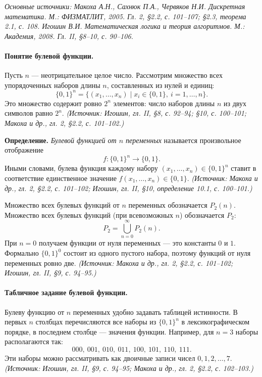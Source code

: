 \documentclass[a4paper,12pt]{article}
\begin{document}
\noindent\textit{Основные источники: Макоха А.Н., Сахнюк П.А., Червяков Н.И. Дискретная математика. М.: ФИЗМАТЛИТ, 2005. Гл. 2, §2.2, с. 101--107; §2.3, теорема 2.1, с. 108. Игошин В.И. Математическая логика и теория алгоритмов. М.: Академия, 2008. Гл. II, §8--10, с. 90--106.}

\paragraph{Понятие булевой функции.}
Пусть \(n\) — неотрицательное целое число. Рассмотрим множество всех упорядоченных наборов длины \(n\), составленных из нулей и единиц:
\[
\{0,1\}^n=\{(x_1,\ldots,x_n)\mid x_i\in\{0,1\},\ i=1,\ldots,n\}.
\]
Это множество содержит ровно \(2^n\) элементов: число наборов длины \(n\) из двух символов равно \(2^n\).
\textit{(Источник: Игошин, гл. II, §8, с. 92--94; §10, с. 100--101; Макоха и др., гл. 2, §2.2, с. 101--102.)}

\textbf{Определение.} \emph{Булевой функцией от \(n\) переменных} называется произвольное отображение
\[
f:\{0,1\}^n\to\{0,1\}.
\]
Иными словами, булева функция каждому набору \((x_1,\ldots,x_n)\in\{0,1\}^n\) ставит в соответствие единственное значение \(f(x_1,\ldots,x_n)\in\{0,1\}\).
\textit{(Источник: Макоха и др., гл. 2, §2.2, с. 101--102; Игошин, гл. II, §10, определение 10.1, с. 100--101.)}

Множество всех булевых функций от \(n\) переменных обозначается \(P_2(n)\). Множество всех булевых функций (при всевозможных \(n\)) обозначается \(P_2\):
\[
P_2=\bigcup_{n=0}^{\infty}P_2(n).
\]
При \(n=0\) получаем функции от нуля переменных — это константы \(0\) и \(1\). Формально \(\{0,1\}^0\) состоит из одного пустого набора, поэтому функций от нуля переменных ровно две.
\textit{(Источник: Макоха и др., гл. 2, §2.2, с. 101--102; Игошин, гл. II, §9, с. 94--95.)}

\paragraph{Табличное задание булевой функции.}
Булеву функцию от \(n\) переменных удобно задавать таблицей истинности. В первых \(n\) столбцах перечисляются все наборы из \(\{0,1\}^n\) в лексикографическом порядке, в последнем столбце — значения функции. Например, для \(n=3\) наборы располагаются так:
\[
000,\ 001,\ 010,\ 011,\ 100,\ 101,\ 110,\ 111.
\]
Эти наборы можно рассматривать как двоичные записи чисел \(0,1,2,\ldots,7\).
\textit{(Источник: Игошин, гл. II, §9, с. 94--95; Макоха и др., гл. 2, §2.2, с. 102--103.)}
\end{document}
